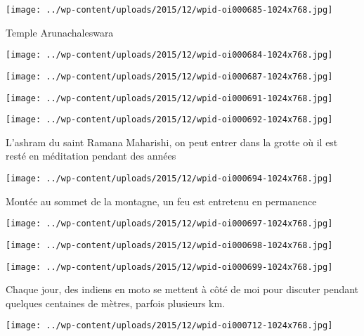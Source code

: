  \newline
\centerline{\texttt{[image: ../wp-content/uploads/2015/12/wpid-oi000685-1024x768.jpg]} } 
 \newline
 Temple Arunachaleswara \newline
 \newline
\centerline{\texttt{[image: ../wp-content/uploads/2015/12/wpid-oi000684-1024x768.jpg]} } 
 \newline
 \newline
\centerline{\texttt{[image: ../wp-content/uploads/2015/12/wpid-oi000687-1024x768.jpg]} } 
 \newline
 \newline
\centerline{\texttt{[image: ../wp-content/uploads/2015/12/wpid-oi000691-1024x768.jpg]} } 
 \newline
 \newline
\centerline{\texttt{[image: ../wp-content/uploads/2015/12/wpid-oi000692-1024x768.jpg]} } 
 \newline
 L'ashram du saint Ramana Maharishi, on peut entrer dans la grotte où il est resté en méditation pendant des années \newline
 \newline
\centerline{\texttt{[image: ../wp-content/uploads/2015/12/wpid-oi000694-1024x768.jpg]} } 
 \newline
 Montée au sommet de la montagne, un feu est entretenu en permanence \newline
 \newline
\centerline{\texttt{[image: ../wp-content/uploads/2015/12/wpid-oi000697-1024x768.jpg]} } 
 \newline
 \newline
\centerline{\texttt{[image: ../wp-content/uploads/2015/12/wpid-oi000698-1024x768.jpg]} } 
 \newline
 \newline
\centerline{\texttt{[image: ../wp-content/uploads/2015/12/wpid-oi000699-1024x768.jpg]} } 
 \newline
 Chaque jour, des indiens en moto se mettent à côté de moi pour discuter pendant quelques centaines de mètres, parfois plusieurs km. \newline
 \newline
\centerline{\texttt{[image: ../wp-content/uploads/2015/12/wpid-oi000712-1024x768.jpg]} } 
 \newline
 \newline
